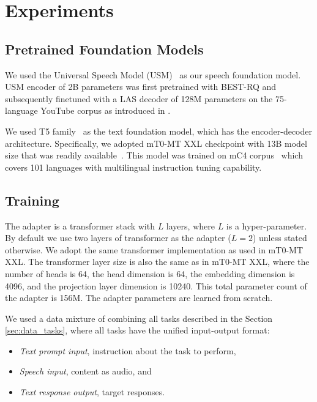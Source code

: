 \section{Experiments}
\label{sec:expts}

\subsection{Pretrained Foundation Models}

We used the Universal Speech Model (USM)~\cite{zhang2023google} as our speech foundation model. USM encoder of 2B parameters was first pretrained with BEST-RQ \cite{chiu2022self} and subsequently finetuned with a LAS decoder of 128M parameters on the 75-language YouTube corpus as introduced in \cite{zhang2023google}. 

We used T5 family~\cite{raffel2020exploring} as the text foundation model, which has the encoder-decoder architecture. Specifically, we adopted mT0-MT XXL checkpoint with 13B model size that was readily available~\cite{muennighoff2022crosslingual}. This model was trained on mC4 corpus~\cite{xue2020mt5} which covers 101 languages with multilingual instruction tuning capability.

\subsection{Training}
\label{sec:train}
The adapter is a transformer stack with $L$ layers, where $L$ is a hyper-parameter. By default we use two layers of transformer as the adapter ($L=2$) unless stated otherwise. We adopt the same transformer implementation as used in mT0-MT XXL. The transformer layer size is also the same as in mT0-MT XXL, where the number of heads is 64, the head dimension is 64, the embedding dimension is 4096, and the projection layer dimension is 10240. This total parameter count of the adapter is 156M. The adapter parameters are learned from scratch.

We used a data mixture of combining all tasks described in the Section \ref{sec:data_tasks}, where all tasks have the unified input-output format:

\begin{itemize}
\itemsep 0in
    \item {\em Text prompt input}, instruction about the task to perform,
    \item {\em Speech input}, content as audio, and
    \item {\em Text response output}, target responses.
\end{itemize}

